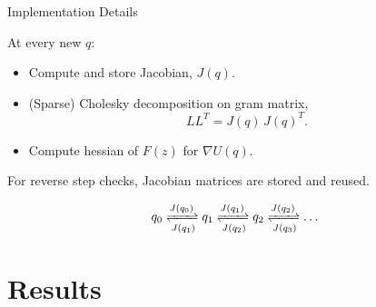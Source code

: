 \documentclass[10pt]{beamer}
\begin{document}
\begin{frame}[fragile]{Implementation Details}

    At every new $q$:
    \begin{itemize}
        \item Compute and store Jacobian, $J(q)$.
        \item (Sparse) Cholesky decomposition on gram matrix, $$LL^T = J(q) \, J(q)^T.$$
        \item Compute hessian of $F(z)$ for $\nabla U(q)$.
    \end{itemize}
    
    \vspace{10pt}
    For reverse step checks, Jacobian matrices are stored and reused.
    
    $$q_0 \xrightleftharpoons[J(q_1)]{J(q_0)} q_1 \xrightleftharpoons[J(q_2)]{J(q_1)} q_2 \xrightleftharpoons[J(q_3)]{J(q_2)} \dots$$
    
\end{frame}

\section{Results}
\end{document}
